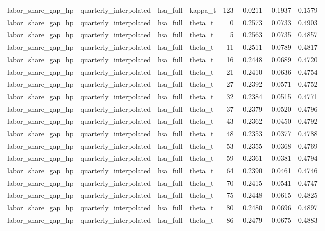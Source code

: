 \begin{tabular}{llllrrrr}
labor\_share\_gap\_hp & quarterly\_interpolated & hsa\_full & kappa\_t & 123 & -0.0211 & -0.1937 & 0.1579 \\
labor\_share\_gap\_hp & quarterly\_interpolated & hsa\_full & theta\_t & 0 & 0.2573 & 0.0733 & 0.4903 \\
labor\_share\_gap\_hp & quarterly\_interpolated & hsa\_full & theta\_t & 5 & 0.2563 & 0.0735 & 0.4857 \\
labor\_share\_gap\_hp & quarterly\_interpolated & hsa\_full & theta\_t & 11 & 0.2511 & 0.0789 & 0.4817 \\
labor\_share\_gap\_hp & quarterly\_interpolated & hsa\_full & theta\_t & 16 & 0.2448 & 0.0689 & 0.4720 \\
labor\_share\_gap\_hp & quarterly\_interpolated & hsa\_full & theta\_t & 21 & 0.2410 & 0.0636 & 0.4754 \\
labor\_share\_gap\_hp & quarterly\_interpolated & hsa\_full & theta\_t & 27 & 0.2392 & 0.0571 & 0.4752 \\
labor\_share\_gap\_hp & quarterly\_interpolated & hsa\_full & theta\_t & 32 & 0.2384 & 0.0515 & 0.4771 \\
labor\_share\_gap\_hp & quarterly\_interpolated & hsa\_full & theta\_t & 37 & 0.2379 & 0.0520 & 0.4796 \\
labor\_share\_gap\_hp & quarterly\_interpolated & hsa\_full & theta\_t & 43 & 0.2362 & 0.0450 & 0.4792 \\
labor\_share\_gap\_hp & quarterly\_interpolated & hsa\_full & theta\_t & 48 & 0.2353 & 0.0377 & 0.4788 \\
labor\_share\_gap\_hp & quarterly\_interpolated & hsa\_full & theta\_t & 53 & 0.2355 & 0.0368 & 0.4769 \\
labor\_share\_gap\_hp & quarterly\_interpolated & hsa\_full & theta\_t & 59 & 0.2361 & 0.0381 & 0.4794 \\
labor\_share\_gap\_hp & quarterly\_interpolated & hsa\_full & theta\_t & 64 & 0.2390 & 0.0461 & 0.4746 \\
labor\_share\_gap\_hp & quarterly\_interpolated & hsa\_full & theta\_t & 70 & 0.2415 & 0.0541 & 0.4747 \\
labor\_share\_gap\_hp & quarterly\_interpolated & hsa\_full & theta\_t & 75 & 0.2448 & 0.0615 & 0.4825 \\
labor\_share\_gap\_hp & quarterly\_interpolated & hsa\_full & theta\_t & 80 & 0.2480 & 0.0696 & 0.4897 \\
labor\_share\_gap\_hp & quarterly\_interpolated & hsa\_full & theta\_t & 86 & 0.2479 & 0.0675 & 0.4883 \\

\end{tabular}
